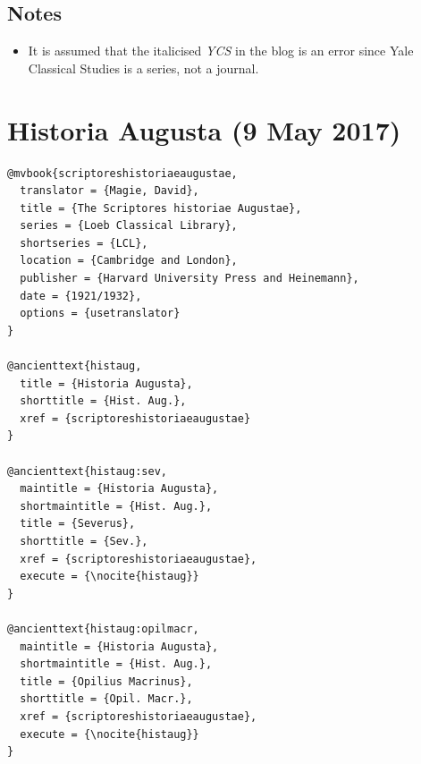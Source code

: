 \documentclass[a4paper]{article}
\begin{document}
\nocite{musoniusrufusfrag:abbrev}
\exampleancientsources
\examplesecondarysources
\examplebibliography
{}

\subsection{Notes}

\begin{itemize}
  \item It is assumed that the italicised \emph{YCS} in the blog is an error
    since Yale Classical Studies is a series, not a journal.
\end{itemize}

\section{Historia Augusta (9 May 2017)}

\begin{verbatim}
@mvbook{scriptoreshistoriaeaugustae,
  translator = {Magie, David},
  title = {The Scriptores historiae Augustae},
  series = {Loeb Classical Library},
  shortseries = {LCL},
  location = {Cambridge and London},
  publisher = {Harvard University Press and Heinemann},
  date = {1921/1932},
  options = {usetranslator}
}

@ancienttext{histaug,
  title = {Historia Augusta},
  shorttitle = {Hist. Aug.},
  xref = {scriptoreshistoriaeaugustae}
}

@ancienttext{histaug:sev,
  maintitle = {Historia Augusta},
  shortmaintitle = {Hist. Aug.},
  title = {Severus},
  shorttitle = {Sev.},
  xref = {scriptoreshistoriaeaugustae},
  execute = {\nocite{histaug}}
}

@ancienttext{histaug:opilmacr,
  maintitle = {Historia Augusta},
  shortmaintitle = {Hist. Aug.},
  title = {Opilius Macrinus},
  shorttitle = {Opil. Macr.},
  xref = {scriptoreshistoriaeaugustae},
  execute = {\nocite{histaug}}
}
\end{verbatim}

\nocite{histaug}
\exampleancientsources
\examplesecondarysources
\examplebibliography
{}
\end{document}

